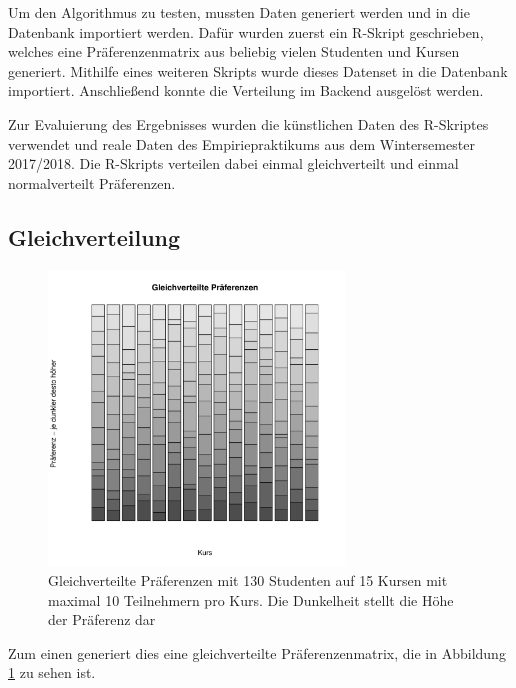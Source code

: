 		Um den Algorithmus zu testen, mussten Daten generiert werden und in die Datenbank importiert werden.
		Dafür wurden zuerst ein R-Skript geschrieben, welches eine Präferenzenmatrix aus beliebig vielen Studenten und Kursen generiert.
		Mithilfe eines weiteren Skripts wurde dieses Datenset in die Datenbank importiert.
		Anschließend konnte die Verteilung im Backend ausgelöst werden.\newline
		
		Zur Evaluierung des Ergebnisses wurden die künstlichen Daten des R-Skriptes verwendet und reale Daten des Empiriepraktikums aus dem Wintersemester 2017/2018.
		Die R-Skripts verteilen dabei einmal gleichverteilt und einmal normalverteilt Präferenzen.
		
		\subsection{Gleichverteilung}
	
			\begin{figure}
				\centering
				\includegraphics[width=0.7\textwidth]{./testing/images/EqualDistPreferencesDist.jpg}
				\caption{Gleichverteilte Präferenzen mit 130 Studenten auf 15 Kursen mit maximal 10 Teilnehmern pro Kurs. Die Dunkelheit stellt die Höhe der Präferenz dar}
				\label{fig:test_equal_distribution}
			\end{figure}
			Zum einen generiert dies eine gleichverteilte Präferenzenmatrix, die in Abbildung \ref{fig:test_equal_distribution} zu sehen ist.
			
